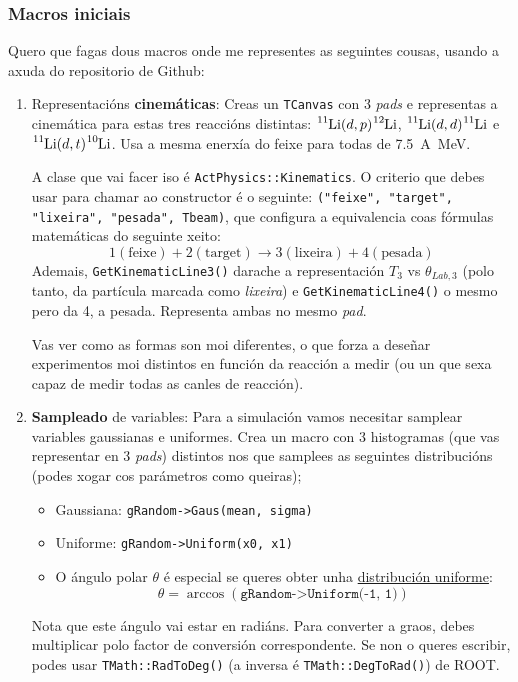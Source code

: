 \documentclass[11pt, a4paper]{article}
\newcommand{\iso}[2]{\ce{^{#1}#2}}
\begin{document}
\subsubsection*{Macros iniciais}
Quero que fagas dous macros onde me representes as seguintes cousas, usando a axuda do repositorio de Github:
\begin{enumerate}
    \item Representacións \textbf{cinemáticas}: Creas un \lstinline|TCanvas| con 3 \textit{pads} e representas a cinemática para estas tres reaccións distintas: $\iso{11}{Li}(d, p)\iso{12}{Li}$, $\iso{11}{Li}(d, d)\iso{11}{Li}$ e $\iso{11}{Li}(d, t)\iso{10}{Li}$. Usa a mesma enerxía do feixe para todas de \qty{7.5}{A\MeV}.
    
    A clase que vai facer iso é \lstinline|ActPhysics::Kinematics|. O criterio que debes usar para chamar ao constructor é o seguinte: \lstinline|("feixe", "target", "lixeira", "pesada", Tbeam)|, que configura a equivalencia coas fórmulas matemáticas do seguinte xeito: $$1 (\text{feixe}) + 2 (\text{target}) \longrightarrow 3 (\text{lixeira}) + 4 (\text{pesada})$$
    Ademais, \lstinline|GetKinematicLine3()| darache a representación $T_3$ vs $\theta_{Lab, 3}$ (polo tanto, da partícula marcada como \textit{lixeira}) e \lstinline|GetKinematicLine4()| o mesmo pero da 4, a pesada. Representa ambas no mesmo \textit{pad}.

    Vas ver como as formas son moi diferentes, o que forza a deseñar experimentos moi distintos en función da reacción a medir (ou un que sexa capaz de medir todas as canles de reacción).
    
    \item \textbf{Sampleado} de variables: Para a simulación vamos necesitar samplear variables gaussianas e uniformes. Crea un macro con 3 histogramas (que vas representar en 3 \textit{pads}) distintos nos que samplees as seguintes distribucións (podes xogar cos parámetros como queiras);
    \begin{itemize}
        \item Gaussiana: \lstinline|gRandom->Gaus(mean, sigma)|
        \item Uniforme: \lstinline|gRandom->Uniform(x0, x1)|
        \item O ángulo polar $\theta$ é especial se queres obter unha \href{https://mathworld.wolfram.com/SpherePointPicking.html}{distribución uniforme}:
        $$\theta = \arccos\left(\texttt{gRandom->Uniform(-1, 1)}\right)$$
    \end{itemize}
    Nota que este ángulo vai estar en radiáns. Para converter a graos, debes multiplicar polo factor de conversión correspondente. Se non o queres escribir, podes usar \lstinline|TMath::RadToDeg()| (a inversa é \lstinline|TMath::DegToRad()|) de ROOT.
\end{enumerate}
\end{document}
